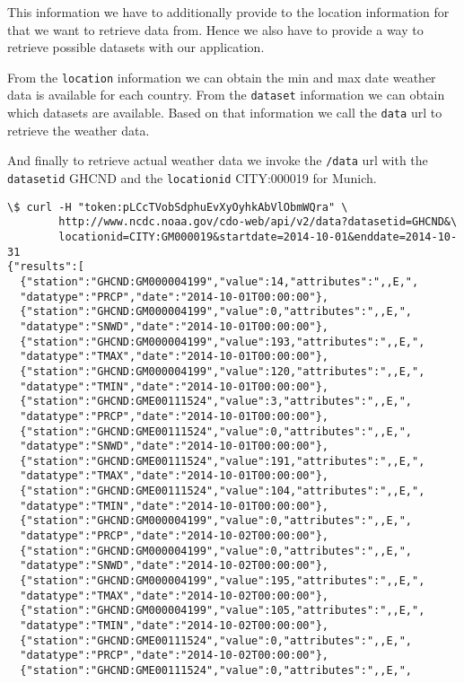 \documentclass[10pt, a4paper]{article}
\begin{document}
This information we have to additionally provide to the location information
for that we want to retrieve data from. Hence we also have to provide a way to
retrieve possible datasets with our application. 

From the \texttt{location} information we can obtain the min and max date 
weather data is available for each country. From the \texttt{dataset} 
information we can obtain which datasets are available. Based on that 
information we call the \texttt{data} url to retrieve the weather data.

And finally to retrieve actual weather data we invoke the \texttt{/data} url
with the \texttt{datasetid} GHCND and the \texttt{locationid} CITY:000019 for
Munich.

\begin{verbatim}
\$ curl -H "token:pLCcTVobSdphuEvXyOyhkAbVlObmWQra" \
        http://www.ncdc.noaa.gov/cdo-web/api/v2/data?datasetid=GHCND&\
        locationid=CITY:GM000019&startdate=2014-10-01&enddate=2014-10-31
{"results":[
  {"station":"GHCND:GM000004199","value":14,"attributes":",,E,",
  "datatype":"PRCP","date":"2014-10-01T00:00:00"},
  {"station":"GHCND:GM000004199","value":0,"attributes":",,E,",
  "datatype":"SNWD","date":"2014-10-01T00:00:00"},
  {"station":"GHCND:GM000004199","value":193,"attributes":",,E,",
  "datatype":"TMAX","date":"2014-10-01T00:00:00"},
  {"station":"GHCND:GM000004199","value":120,"attributes":",,E,",
  "datatype":"TMIN","date":"2014-10-01T00:00:00"},
  {"station":"GHCND:GME00111524","value":3,"attributes":",,E,",
  "datatype":"PRCP","date":"2014-10-01T00:00:00"},
  {"station":"GHCND:GME00111524","value":0,"attributes":",,E,",
  "datatype":"SNWD","date":"2014-10-01T00:00:00"},
  {"station":"GHCND:GME00111524","value":191,"attributes":",,E,",
  "datatype":"TMAX","date":"2014-10-01T00:00:00"},
  {"station":"GHCND:GME00111524","value":104,"attributes":",,E,",
  "datatype":"TMIN","date":"2014-10-01T00:00:00"},
  {"station":"GHCND:GM000004199","value":0,"attributes":",,E,",
  "datatype":"PRCP","date":"2014-10-02T00:00:00"},
  {"station":"GHCND:GM000004199","value":0,"attributes":",,E,",
  "datatype":"SNWD","date":"2014-10-02T00:00:00"},
  {"station":"GHCND:GM000004199","value":195,"attributes":",,E,",
  "datatype":"TMAX","date":"2014-10-02T00:00:00"},
  {"station":"GHCND:GM000004199","value":105,"attributes":",,E,",
  "datatype":"TMIN","date":"2014-10-02T00:00:00"},
  {"station":"GHCND:GME00111524","value":0,"attributes":",,E,",
  "datatype":"PRCP","date":"2014-10-02T00:00:00"},
  {"station":"GHCND:GME00111524","value":0,"attributes":",,E,",

\end{verbatim}
\end{document}
